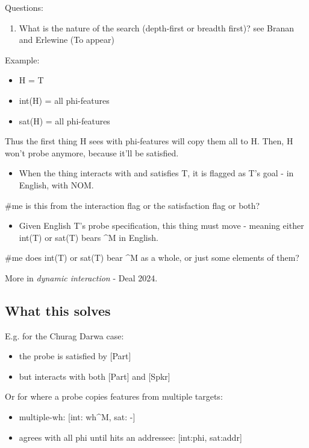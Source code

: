 Questions:

\begin{enumerate}
  \item What is the nature of the search (depth-first or breadth first)? see Branan and Erlewine (To appear)
\end{enumerate}

Example:

\begin{itemize}
  \item H = T
  \item int(H) = all phi-features
  \item sat(H) = all phi-features
\end{itemize}
Thus the first thing H sees with phi-features will copy them all to H. Then, H won't probe anymore, because it'll be satisfied.

\begin{itemize}
  \item When the thing interacts with and satisfies T, it is flagged as T's goal - in English, with NOM.
\end{itemize}
\#me is this from the interaction flag or the satisfaction flag or both?

\begin{itemize}
  \item Given English T's probe specification, this thing must move - meaning either int(T) or sat(T) bears \textasciicircum{}M in English.
\end{itemize}
\#me does int(T) or sat(T) bear \textasciicircum{}M as a whole, or just some elements of them?

More in \textit{dynamic interaction} - Deal 2024.

\subsection*{What this solves}

E.g. for the Churag Darwa case:

\begin{itemize}
  \item the probe is satisfied by [Part]
  \item but interacts with both [Part] and [Spkr]
\end{itemize}

Or for where a probe copies features from multiple targets:

\begin{itemize}
  \item multiple-wh: [int: wh\textasciicircum{}M, sat: -]
  \item agrees with all phi until hits an addressee: [int:phi, sat:addr]
\end{itemize}

